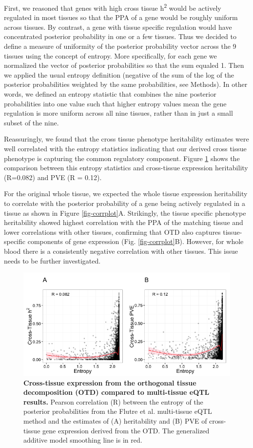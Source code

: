 \documentclass[10pt,letterpaper]{article}
\begin{document}
First, we reasoned that genes with high cross tissue h\textsuperscript{2} would be actively regulated in most tissues so that the PPA of a gene would be roughly uniform across tissues. By contrast, a gene with tissue specific regulation would have concentrated posterior probability in one or a few tissues. Thus we decided to define a measure of uniformity of the posterior probability vector across the 9 tissues using the concept of entropy. More specifically, for each gene we normalized the vector of posterior probabilities so that the sum equaled 1. Then we applied the usual entropy definition (negative of the sum of the log of the posterior probabilities weighted by the same probabilities, see Methods). In other words, we defined an entropy statistic that combines the nine posterior probabilities into one value such that higher entropy values mean the gene regulation is more uniform across all nine tissues, rather than in just a small subset of the nine.

Reassuringly, we found that the cross tissue phenotype heritability estimates were well correlated with the entropy statistics indicating that our derived cross tissue phenotype is capturing the common regulatory component. Figure \ref{fig-ct-entropy} shows the comparison between this entropy statistics and cross-tissue expression heritability (R=0.082) and PVE (R = 0.12).

For the original whole tissue, we expected the whole tissue expression heritability to correlate with the posterior probability of a gene being actively regulated in a tissue as shown in Figure \ref{fig-corrplot}A. Strikingly, the tissue specific phenotype heritability showed highest correlation with the PPA of the matching tissue and lower correlations with other tissues, confirming that OTD also captures tissue-specific components of gene expression (Fig. \ref{fig-corrplot}B). However, for whole blood there is a consistently negative correlation with other tissues. This issue needs to be further investigated.

\begin{figure}[h]
\includegraphics[width=12cm]{Figures/Fig-CT-entropy.png}
\caption{{\bf Cross-tissue expression from the 
orthogonal tissue decomposition (OTD) compared to multi-tissue eQTL results.} 
Pearson correlation (R) between the entropy of the posterior probabilities
from the Flutre et al. multi-tissue eQTL method 
and the estimates of (A) heritability and (B) PVE of cross-tissue
gene expression derived from the OTD. The generalized additive model smoothing 
line is in red.}
\label{fig-ct-entropy}
\end{figure}
\end{document}

